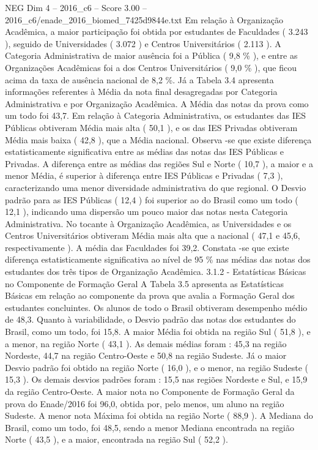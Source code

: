\begin{textsample}{NEG Dim 4 – 2016\_c6 – Score 3.00 – 2016\_c6/enade\_2016\_biomed\_7425d9844e.txt}
Em relação à Organização Acadêmica, a maior participação foi obtida por estudantes de Faculdades ( 3.243 ), seguido de Universidades ( 3.072 ) e Centros Universitários ( 2.113 ).
A Categoria Administrativa de maior ausência foi a Pública ( 9,8 \% ), e entre as Organizações Acadêmicas foi a dos Centros Universitários ( 9,0 \% ), que ficou acima da taxa de ausência nacional de 8,2 \%.
Já a Tabela 3.4 apresenta informações referentes à Média da nota final desagregadas por Categoria Administrativa e por Organização Acadêmica.
A Média das notas da prova como um todo foi 43,7.
Em relação à Categoria Administrativa, os estudantes das IES Públicas obtiveram Média mais alta ( 50,1 ), e os das IES Privadas obtiveram Média mais baixa ( 42,8 ), que a Média nacional.
Observa -se que existe diferença estatisticamente significativa entre as médias das notas das IES Públicas e Privadas.
A diferença entre as médias das regiões Sul e Norte ( 10,7 ), a maior e a menor Média, é superior à diferença entre IES Públicas e Privadas ( 7,3 ), caracterizando uma menor diversidade administrativa do que regional.
O Desvio padrão para as IES Públicas ( 12,4 ) foi superior ao do Brasil como um todo ( 12,1 ), indicando uma dispersão um pouco maior das notas nesta Categoria Administrativa.
No tocante à Organização Acadêmica, as Universidades e os Centros Universitários obtiveram Média mais alta que a nacional ( 47,1 e 45,6, respectivamente ).
A média das Faculdades foi 39,2.
Constata -se que existe diferença estatisticamente significativa ao nível de 95 \% nas médias das notas dos estudantes dos três tipos de Organização Acadêmica. 3.1.2 - Estatísticas Básicas no Componente de Formação Geral A Tabela 3.5 apresenta as Estatísticas Básicas em relação ao componente da prova que avalia a Formação Geral dos estudantes concluintes.
Os alunos de todo o Brasil obtiveram desempenho médio de 48,3.
Quanto à variabilidade, o Desvio padrão das notas dos estudantes do Brasil, como um todo, foi 15,8.
A maior Média foi obtida na região Sul ( 51,8 ), e a menor, na região Norte ( 43,1 ).
As demais médias foram : 45,3 na região Nordeste, 44,7 na região Centro-Oeste e 50,8 na região Sudeste.
Já o maior Desvio padrão foi obtido na região Norte ( 16,0 ), e o menor, na região Sudeste ( 15,3 ).
Os demais desvios padrões foram : 15,5 nas regiões Nordeste e Sul, e 15,9 da região Centro-Oeste.
A maior nota no Componente de Formação Geral da prova do Enade/2016 foi 96,0, obtida por, pelo menos, um aluno na região Sudeste.
A menor nota Máxima foi obtida na região Norte ( 88,9 ).
A Mediana do Brasil, como um todo, foi 48,5, sendo a menor Mediana encontrada na região Norte ( 43,5 ), e a maior, encontrada na região Sul ( 52,2 ).

\end{textsample}
